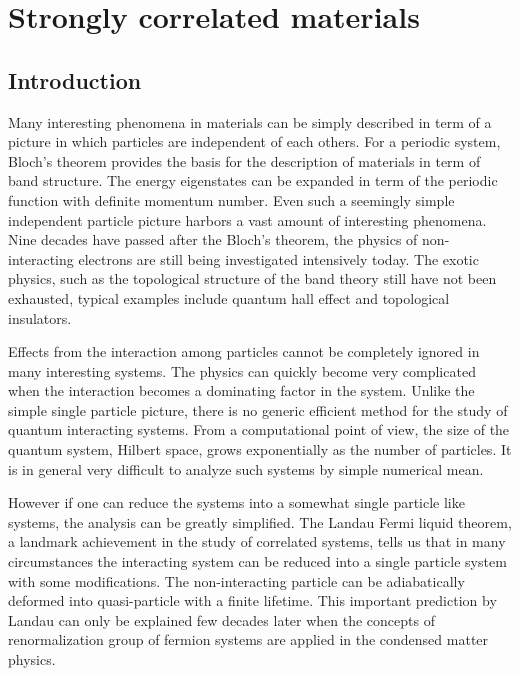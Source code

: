 

\chapter{Strongly correlated materials}
\label{chap:cthyb}
\section{Introduction}

Many interesting phenomena in materials can be simply described in term
of a picture in which particles are independent of each others. For a periodic
system, Bloch's theorem provides the basis for the description of materials
in term of band structure. The energy eigenstates can be expanded in term
of the periodic function with definite momentum number. Even such a seemingly
simple independent particle picture harbors a vast amount of interesting phenomena.
Nine decades have passed after the Bloch's theorem, the physics of non-interacting electrons are
still being investigated intensively today. The exotic physics, such as 
the topological structure of the band theory still have not been exhausted,
typical examples include quantum hall effect and topological insulators.

Effects from the interaction among particles cannot be completely ignored in many
interesting systems. The physics can quickly become very complicated when
the interaction becomes a dominating factor in the system. Unlike the simple
single particle picture, there is no generic efficient method for the study 
of quantum interacting systems. From a computational point of view, the size
of the quantum system, Hilbert space, grows exponentially as the number of 
particles. It is in general very difficult to analyze such systems by simple numerical mean.

However if one can reduce the systems into a somewhat single particle like systems,
the analysis can be greatly simplified. The Landau Fermi liquid theorem, a landmark
achievement in the study of correlated systems, tells us that in many
circumstances the interacting system can be reduced into a single particle system with
some modifications. The non-interacting particle can be adiabatically deformed
into quasi-particle with a finite lifetime. This important prediction by Landau
can only be explained few decades later when the concepts of renormalization group
of fermion systems are applied in the condensed matter physics.

